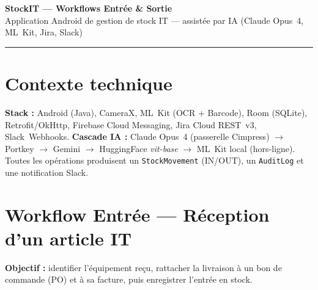 \documentclass[11pt,a4paper]{article}
\begin{document}
\begin{center}
  {\LARGE\bfseries StockIT — Workflows Entrée \& Sortie}\\[2pt]
  {\small Application Android de gestion de stock IT — assistée par IA
  (Claude Opus~4, ML~Kit, Jira, Slack)}\\[-2pt]
  \rule{\linewidth}{0.4pt}
\end{center}

\section{Contexte technique}
\vspace{-2pt}
\textbf{Stack :} Android (Java), CameraX, ML~Kit (OCR + Barcode), Room (SQLite),
Retrofit/OkHttp, Firebase Cloud Messaging, Jira Cloud REST~v3, Slack~Webhooks.
\textbf{Cascade IA :} Claude Opus~4 (passerelle Cimpress) $\rightarrow$ Portkey
$\rightarrow$ Gemini $\rightarrow$ HuggingFace \emph{vit-base} $\rightarrow$ ML~Kit local (hors‑ligne).
Toutes les opérations produisent un \texttt{StockMovement} (IN/OUT), un
\texttt{AuditLog} et une notification Slack.

\section{Workflow Entrée — Réception d'un article IT}
\vspace{-2pt}

\begin{tcolorbox}[colback=blue!3,colframe=blue!40!black,
  boxrule=0.4pt,arc=2pt,left=6pt,right=6pt,top=4pt,bottom=4pt]
\textbf{Objectif :} identifier l'équipement reçu, rattacher la livraison à
un bon de commande (PO) et à sa facture, puis enregistrer l'entrée en stock.
\end{tcolorbox}
\end{document}
